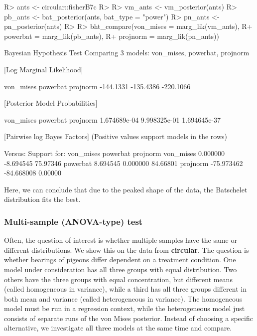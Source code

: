 \documentclass{article}
\newcommand{\code}[1]{\texttt{\detokenize{#1}}}
\newcommand{\pkg}[1]{\textbf{#1}}
\newenvironment{CodeChunk}{}{}
\begin{document}
\begin{CodeChunk}
	
	\begin{CodeInput}
		R> ants <- circular::fisherB7c
		R> 
		R> vm_ants <- vm_posterior(ants)
		R> pb_ants <- bat_posterior(ants, bat_type = "power")
		R> pn_ants <- pn_posterior(ants)
		R> 
		R> bht_compare(von_mises = marg_lik(vm_ants), 
		R+             powerbat  = marg_lik(pb_ants), 
		R+             projnorm  = marg_lik(pn_ants))
	\end{CodeInput}
	
	\begin{CodeOutput}
		Bayesian Hypothesis Test
		Comparing 3 models: von_mises, powerbat, projnorm
		
		[Log Marginal Likelihood]
		
		von_mises  powerbat  projnorm 
		-144.1331 -135.4386 -220.1066 
		
		
		[Posterior Model Probabilities]
		
		von_mises     powerbat     projnorm 
		1.674689e-04 9.998325e-01 1.694645e-37 
		
		
		[Pairwise log Bayes Factors]
		(Positive values support models in the rows)
		
		Versus: 
		Support for:     von_mises   powerbat projnorm
		von_mises   0.000000  -8.694545 75.97346
		powerbat    8.694545   0.000000 84.66801
		projnorm  -75.973462 -84.668008  0.00000
	\end{CodeOutput}
\end{CodeChunk}

Here, we can conclude that due to the peaked shape of the data, the
Batschelet distribution fits the best.

\hypertarget{multi-sample-anova-type-test}{%
	\subsubsection{Multi-sample (ANOVA-type)
		test}\label{multi-sample-anova-type-test}}

Often, the question of interest is whether multiple samples have the
same or different distributions. We show this on the \code{pigeons} data
\citep{gagliardo2008navigational, fisher1995statistical} from
\pkg{circular}. The question is whether bearings of pigeons differ
dependent on a treatment condition. One model under consideration has
all three groups with equal distribution. Two others have the three
groups with equal concentration, but different means (called homogeneous
in variance), while a third has all three groups different in both mean
and variance (called heterogeneous in variance). The homogeneous model
must be run in a regression context, while the heterogeneous model just
consists of separate runs of the von Mises posterior. Instead of
choosing a specific alternative, we investigate all three models at the
same time and compare.
\end{document}
